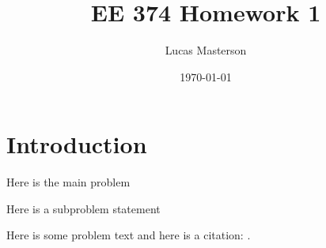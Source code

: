 \documentclass[11pt]{article}
\title{EE 374 Homework 1}
\author{Lucas Masterson}
\date{\today}
\begin{document}
\maketitle

\section{Introduction}

Here is the main problem

\begin{p}
Here is a subproblem statement
\end{p}

Here is some problem text and here is a citation: \citep{somekey}.



\end{document}
